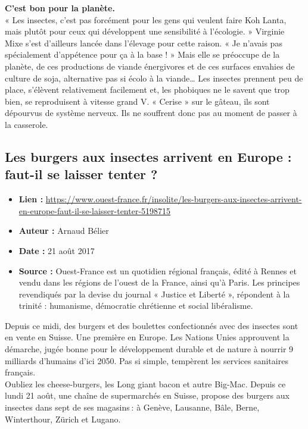 \documentclass[8pt]{article}
\begin{document}
\textbf{C’est bon pour la planète.} \\

«  Les insectes, c’est pas forcément pour les gens qui veulent faire Koh Lanta, mais plutôt pour ceux qui développent une sensibilité à l’écologie.  » Virginie Mixe s’est d’ailleurs lancée dans l’élevage pour cette raison. «  Je n’avais pas spécialement d’appétence pour ça à la base !  » Mais elle se préoccupe de la planète, de ces productions de viande énergivores et de ces surfaces envahies de culture de soja, alternative pas si écolo à la viande… Les insectes prennent peu de place, s’élèvent relativement facilement et, les phobiques ne le savent que trop bien, se reproduisent à vitesse grand V. « Cerise » sur le gâteau, ils sont dépourvus de système nerveux. Ils ne souffrent donc pas au moment de passer à la casserole.

\newpage
\subsection{Les burgers aux insectes arrivent en Europe : faut-il se laisser tenter ?}
\begin{itemize}
	\item \textbf{Lien : }  \url{https://www.ouest-france.fr/insolite/les-burgers-aux-insectes-arrivent-en-europe-faut-il-se-laisser-tenter-5198715} 
	\item \textbf{Auteur : } Arnaud Bélier
	\item \textbf{Date : } 21 août 2017
	\item \textbf{Source : } Ouest-France est un quotidien régional français, édité à Rennes et vendu dans les régions de l'ouest de la France, ainsi qu'à Paris. Les principes revendiqués par la devise du journal « Justice et Liberté », répondent à la trinité : humanisme, démocratie chrétienne et social libéralisme.
\end{itemize}


Depuis ce midi, des burgers et des boulettes confectionnés avec des insectes sont en vente en Suisse. Une première en Europe. Les Nations Unies approuvent la démarche, jugée bonne pour le développement durable et de nature à nourrir 9 milliards d’humains d’ici 2050. Pas si simple, tempèrent les services sanitaires français.\\

Oubliez les cheese-burgers, les Long giant bacon et autre Big-Mac. Depuis ce lundi 21 août, une chaîne de supermarchés en Suisse, propose des burgers aux insectes dans sept de ses magasins : à Genève, Lausanne, Bâle, Berne, Winterthour, Zürich et Lugano.\\
\end{document}
